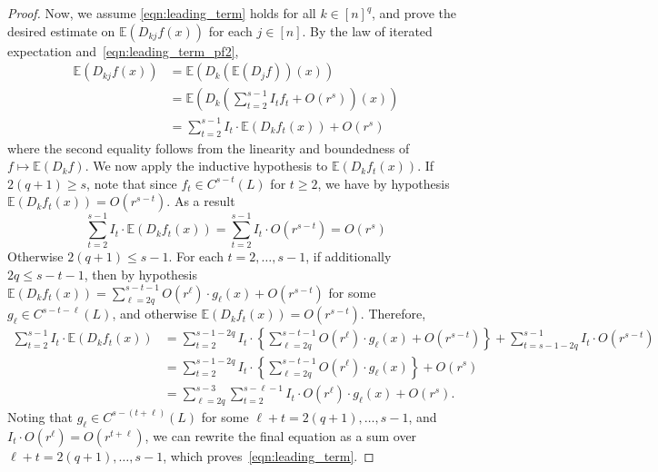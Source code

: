 \documentclass{article}
\newcommand{\1}{\mathbf{1}}
\newcommand{\Ebb}{\mathbb{E}}
\theoremstyle{alden}
\theoremstyle{aldenthm}
\theoremstyle{definition}
\theoremstyle{remark}
\begin{document}
\begin{proof}
	Now, we assume \eqref{eqn:leading_term} holds for all $k \in [n]^q$, and prove the desired estimate on $\Ebb(D_{kj}f(x))$ for each $j \in [n]$. By the law of iterated expectation and~\eqref{eqn:leading_term_pf2},
	\begin{align*}
	\Ebb(D_{kj}f(x)) & = \Ebb(D_k(\Ebb(D_jf))(x)) \\
	& = \Ebb\left(D_k\left(\sum_{t = 2}^{s - 1} I_t f_t + O(r^s)\right)(x)\right) \\
	& = \sum_{t = 2}^{s - 1} I_t \cdot \Ebb(D_kf_t(x)) + O(r^s)
	\end{align*}
	where the second equality follows from the linearity and boundedness of $f \mapsto \Ebb(D_kf)$. We now apply the inductive hypothesis to $\Ebb(D_kf_t(x))$. If $2(q + 1) \geq s$, note that since $f_t \in C^{s - t}(L)$ for $t \geq 2$, we have by hypothesis $\Ebb(D_kf_t(x)) = O(r^{s - t})$. As a result
	\begin{equation*}
	\sum_{t = 2}^{s - 1} I_t \cdot \Ebb(D_kf_t(x)) = \sum_{t = 2}^{s - 1} I_t \cdot O(r^{s - t}) = O(r^s)
	\end{equation*} 
	Otherwise $2(q + 1) \leq s - 1$. For each $t = 2,\ldots, s - 1$, if additionally  $2q \leq s - t - 1$, then by hypothesis $\Ebb(D_kf_t(x)) = \sum_{\ell = 2q}^{s - t - 1} O(r^{\ell}) \cdot g_{\ell}(x) + O(r^{s - t})$ for some $g_{\ell} \in C^{s - t - \ell}(L)$, and otherwise $\Ebb(D_kf_t(x)) = O(r^{s - t})$. Therefore,
	\begin{align*}
	\sum_{t = 2}^{s - 1} I_t \cdot \Ebb(D_kf_t(x)) & = \sum_{t = 2}^{s - 1 - 2q} I_t \cdot \left\{\sum_{\ell = 2q}^{s - t - 1} O(r^{\ell}) \cdot g_{\ell}(x) + O(r^{s - t}) \right\} + \sum_{t = s - 1 - 2q}^{s - 1}I_{t} \cdot O(r^{s - t}) \\
	& = \sum_{t = 2}^{s - 1 - 2q} I_t \cdot \left\{\sum_{\ell = 2q}^{s - t - 1} O(r^{\ell}) \cdot g_{\ell}(x)\right\}  + O(r^s) \\
	& = \sum_{\ell = 2q}^{s - 3} \sum_{t = 2}^{s - \ell - 1} I_t \cdot O(r^{\ell}) \cdot g_{\ell}(x) + O(r^s).
	\end{align*}
	Noting that $g_{\ell} \in C^{s - (t + \ell)}(L)$ for some $\ell + t = 2(q + 1),\ldots,s - 1$, and $I_t \cdot O(r^{\ell}) = O(r^{t + \ell})$, we can rewrite the final equation as a sum over $\ell + t = 2(q + 1),\ldots,s - 1$, which proves~\eqref{eqn:leading_term}.
\end{proof}
\end{document}
